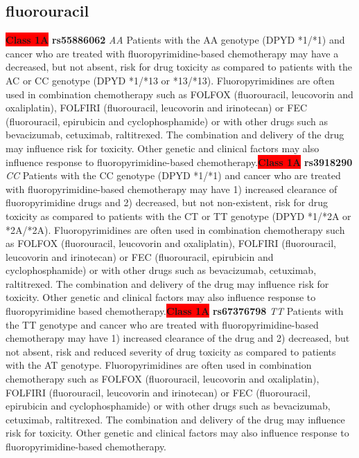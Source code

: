 \documentclass{book}
\begin{document}
\subsection{ fluorouracil }


\begin{center}
\textbf{\colorbox{red} {Class 1A}} \textbf{ rs55886062 } \textit{ AA }
Patients with the AA genotype (DPYD *1/*1) and cancer who are treated with fluoropyrimidine-based chemotherapy may have a decreased, but not absent, risk for drug toxicity as compared to patients with the AC or CC genotype (DPYD *1/*13 or *13/*13). Fluoropyrimidines are often used in combination chemotherapy such as FOLFOX (fluorouracil, leucovorin and oxaliplatin), FOLFIRI (fluorouracil, leucovorin and irinotecan) or FEC (fluorouracil, epirubicin and cyclophosphamide) or with other drugs such as bevacizumab, cetuximab, raltitrexed. The combination and delivery of the drug may influence risk for toxicity. Other genetic and clinical factors may also influence response to fluoropyrimidine-based chemotherapy.\textbf{\colorbox{red} {Class 1A}} \textbf{ rs3918290 } \textit{ CC }
Patients with the CC genotype (DPYD *1/*1) and cancer who are treated with fluoropyrimidine-based chemotherapy may have 1) increased clearance of fluoropyrimidine drugs and 2) decreased, but not non-existent, risk for drug toxicity as compared to patients with the CT or TT genotype (DPYD *1/*2A or *2A/*2A). Fluoropyrimidines are often used in combination chemotherapy such as FOLFOX (fluorouracil, leucovorin and oxaliplatin), FOLFIRI (fluorouracil,  leucovorin and irinotecan) or FEC (fluorouracil, epirubicin and cyclophosphamide) or with other drugs such as bevacizumab, cetuximab, raltitrexed. The combination and delivery of the drug may influence risk for toxicity. Other genetic and clinical factors may also influence response to fluoropyrimidine based chemotherapy.\textbf{\colorbox{red} {Class 1A}} \textbf{ rs67376798 } \textit{ TT }
Patients with the TT genotype and cancer who are treated with fluoropyrimidine-based chemotherapy may have 1) increased clearance of the drug and 2) decreased, but not absent, risk and reduced severity of drug toxicity as compared to patients with the AT genotype. Fluoropyrimidines are often used in combination chemotherapy such as FOLFOX (fluorouracil, leucovorin and oxaliplatin), FOLFIRI (fluorouracil, leucovorin and irinotecan) or FEC (fluorouracil, epirubicin and cyclophosphamide) or with other drugs such as bevacizumab, cetuximab, raltitrexed. The combination and delivery of the drug may influence risk for toxicity. Other genetic and clinical factors may also influence response to fluoropyrimidine-based chemotherapy.




\end{center}
\end{document}
